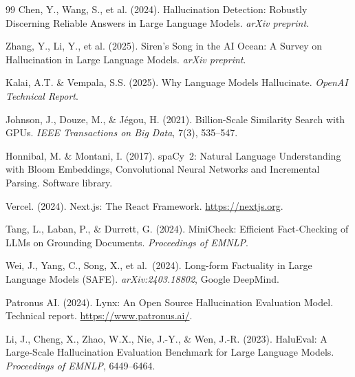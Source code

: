 \documentclass[12pt, a4paper, oneside]{report}
\begin{document}
\begin{thebibliography}{99}
Chen, Y., Wang, S., et al. (2024). Hallucination Detection: Robustly Discerning Reliable Answers in Large Language Models. \textit{arXiv preprint}.

Zhang, Y., Li, Y., et al. (2025). Siren's Song in the AI Ocean: A Survey on Hallucination in Large Language Models. \textit{arXiv preprint}.

Kalai, A.T. \& Vempala, S.S. (2025). Why Language Models Hallucinate. \textit{OpenAI Technical Report}.

Johnson, J., Douze, M., \& J\'{e}gou, H. (2021). Billion-Scale Similarity Search with GPUs. \textit{IEEE Transactions on Big Data}, 7(3), 535--547.

Honnibal, M. \& Montani, I. (2017). spaCy~2: Natural Language Understanding with Bloom Embeddings, Convolutional Neural Networks and Incremental Parsing. Software library.

Vercel. (2024). Next.js: The React Framework. \url{https://nextjs.org}.

Tang, L., Laban, P., \& Durrett, G. (2024). MiniCheck: Efficient Fact-Checking of LLMs on Grounding Documents. \textit{Proceedings of EMNLP}.

Wei, J., Yang, C., Song, X., et al.\ (2024). Long-form Factuality in Large Language Models (SAFE). \textit{arXiv:2403.18802}, Google DeepMind.

Patronus AI. (2024). Lynx: An Open Source Hallucination Evaluation Model. Technical report. \url{https://www.patronus.ai/}.

Li, J., Cheng, X., Zhao, W.X., Nie, J.-Y., \& Wen, J.-R. (2023). HaluEval: A Large-Scale Hallucination Evaluation Benchmark for Large Language Models. \textit{Proceedings of EMNLP}, 6449--6464.

\end{thebibliography}
\end{document}
